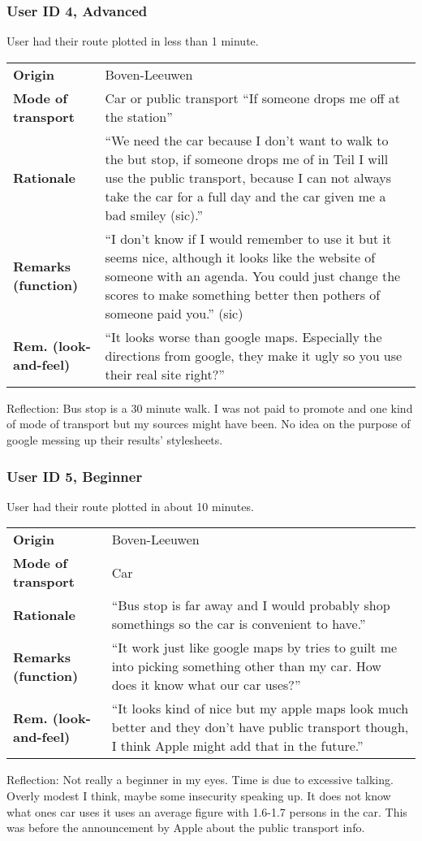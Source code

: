 \documentclass[final,a4paper,11pt]{article}
\newlength{\resulttablecolone}
\newlength{\resulttablecoltwo}
\begin{document}
\subsubsection*{User ID 4, Advanced}
User had their route plotted in less than 1 minute.
\begin{table}[H]
\begin{tabular}{p{\resulttablecolone}|p{\resulttablecoltwo}}
\textbf{Origin} & Boven-Leeuwen \\
\textbf{Mode of transport} & Car or public transport ``If someone drops me off at the station'' \\
\textbf{Rationale} & ``We need the car because I don't want to walk to the but stop, if someone drops me of in Teil I will use the public transport, because I can not always take the car for a full day and the car given me a bad smiley (sic).'' \\
\textbf{Remarks (function)} & ``I don't know if I would remember to use it but it seems nice, although it looks like the website of someone with an agenda. You could just change the scores to make something better then pothers of someone paid you.'' (sic) \\
\textbf{Rem. (look-and-feel)} & ``It looks worse than google maps. Especially the directions from google, they make it ugly so you use their real site right?'' \\
\end{tabular}
\end{table}
Reflection: Bus stop is a 30 minute walk. I was not paid to promote and one kind of mode of transport but my sources might have been. No idea on the purpose of google messing up their results' stylesheets.

\subsubsection*{User ID 5, Beginner}
User had their route plotted in about 10 minutes.
\begin{table}[H]
\begin{tabular}{p{\resulttablecolone}|p{\resulttablecoltwo}}
\textbf{Origin} & Boven-Leeuwen \\
\textbf{Mode of transport} & Car \\
\textbf{Rationale} & ``Bus stop is far away and I would probably shop somethings so the car is convenient to have.'' \\
\textbf{Remarks (function)} & ``It work just like google maps by tries to guilt me into picking something other than my car. How does it know what our car uses?'' \\
\textbf{Rem. (look-and-feel)} & ``It looks kind of nice but my apple maps look much better and they don't have public transport though, I think Apple might add that in the future.'' \\
\end{tabular}
\end{table}
Reflection: Not really a beginner in my eyes. Time is due to excessive talking. Overly modest I think, maybe some insecurity speaking up. It does not know what ones car uses it uses an average figure with 1.6-1.7 persons in the car. This was before the announcement by Apple about the public transport info.
\end{document}

